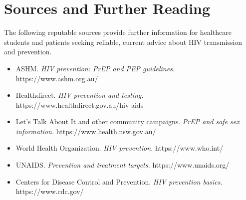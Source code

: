 \section*{Sources and Further Reading}
The following reputable sources provide further information for healthcare students and patients seeking reliable, current advice about HIV transmission and prevention.

\begin{itemize}
    \item ASHM. \textit{HIV prevention: PrEP and PEP guidelines.} https://www.ashm.org.au/
    \item Healthdirect. \textit{HIV prevention and testing.} https://www.healthdirect.gov.au/hiv-aids
    \item Let's Talk About It and other community campaigns. \textit{PrEP and safe sex information.} https://www.health.nsw.gov.au/
    \item World Health Organization. \textit{HIV prevention.} https://www.who.int/
    \item UNAIDS. \textit{Prevention and treatment targets.} https://www.unaids.org/
    \item Centers for Disease Control and Prevention. \textit{HIV prevention basics.} https://www.cdc.gov/
\end{itemize}
